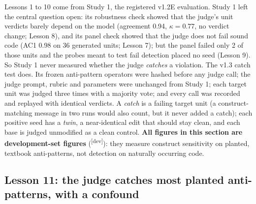 \documentclass[10pt,a4paper]{article}
\newcommand{\devset}{\textsuperscript{\textsf{\tiny[dev]}}}
\begin{document}
Lessons 1 to 10 come from Study 1, the registered v1.2E evaluation. Study 1 left the central question open: its
robustness check showed that the judge's unit verdicts barely depend on the model (agreement 0.94, $\kappa = 0.77$,
no verdict change; Lesson 8), and its panel check showed that the judge does not fail sound code (AC1 0.98 on 36
generated units; Lesson 7); but the panel failed only 2 of those units and the probes meant to test fail detection
placed no seed (Lesson 9). So Study 1 never measured whether the judge \emph{catches} a violation.
The v1.3 catch test does. Its frozen anti-pattern operators were hashed before any judge call; the judge prompt,
rubric and parameters were unchanged from Study 1; each target unit was judged three times with a majority vote; and
every call was recorded and replayed with identical verdicts. %
A \emph{catch} is a failing target unit (a construct-matching message in two runs would also count, but it never
added a catch); each positive seed has a \emph{twin}, a near-identical edit that should stay clean, and each base
is judged unmodified as a clean control. \textbf{All figures in this section are development-set figures}
(\devset{}): they measure construct sensitivity on planted, textbook anti-patterns, not detection on naturally
occurring code. %

\subsection{Lesson 11: the judge catches most planted anti-patterns, with a confound}\label{sec:l11}
\end{document}
